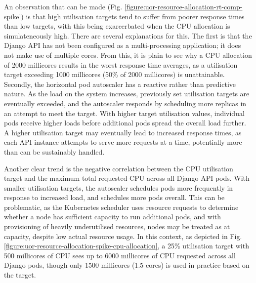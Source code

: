 An observation that can be made (Fig. \ref{figure:uor-resource-allocation-rt-comp-spike}) is that high utilisation targets tend to suffer from poorer response times than low targets, with this being exarcerbated when the CPU allocation is simulateneously high. There are several explanations for this. The first is that the Django API has not been configured as a multi-processing application; it does not make use of multiple cores. From this, it is plain to see why a CPU allocation of 2000 millicores results in the worst response time averages, as a utilisation target exceeding 1000 millicores (50\% of 2000 millicores) is unattainable. Secondly, the horizontal pod autoscaler has a reactive rather than predictive nature. As the load on the system increases, previously set utilisation targets are eventually exceeded, and the autoscaler responds by scheduling more replicas in an attempt to meet the target. With higher target utilisation values, individual pods receive higher loads before additional pods spread the overall load further. A higher utilisation target may eventually lead to increased response times, as each API instance attempts to serve more requests at a time, potentially more than can be sustainably handled.

Another clear trend is the negative correlation between the CPU utilisation target and the maximum total requested CPU across all Django API pods. With smaller utilisation targets, the autoscaler schedules pods more frequently in response to increased load, and schedules more pods overall. This can be problematic, as the Kubernetes scheduler uses resource requests to determine whether a node has sufficient capacity to run additional pods, and with provisioning of heavily underutilised resources, nodes may be treated as at capacity, despite low actual resource usage. In this context, as depicted in Fig. \ref{figure:uor-resource-allocation-spike-cpu-allocation}, a 25\% utilisation target with 500 millicores of CPU sees up to 6000 millicores of CPU requested across all Django pods, though only 1500 millicores (1.5 cores) is used in practice based on the target.

